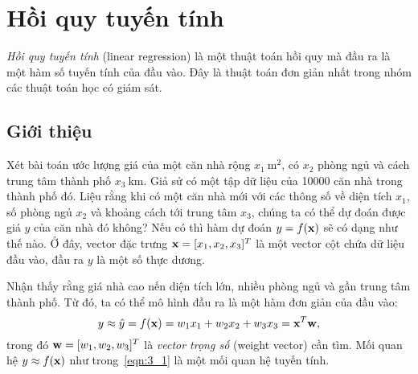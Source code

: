 \chapter{Hồi quy tuyến tính}
\label{cha:linear_regression}

\textit{Hồi quy tuyến tính} (linear regression) là một thuật toán hồi quy mà đầu ra là một hàm số tuyến tính của đầu vào. Đây là thuật toán đơn giản nhất trong nhóm các thuật toán học có giám sát.
\section{Giới thiệu}
Xét bài toán ước lượng giá của một căn nhà rộng $x_1 ~ \text{m}^2$, có $x_2$
phòng ngủ và cách trung tâm thành phố $x_3~ \text{km}$. Giả sử có một tập dữ liệu của 10000 căn nhà trong thành phố đó. Liệu rằng khi có một căn nhà
mới với các thông số về diện tích $x_1$, số phòng ngủ $x_2$ và khoảng cách tới
trung tâm $x_3$, chúng ta có thể dự đoán được giá $y$ của căn nhà đó không? Nếu
có thì hàm dự đoán $y = f(\mathbf{x})$ sẽ có dạng như thế nào. Ở đây, vector đặc
trưng $\mathbf{x} = [x_1, x_2, x_3]^T$ là một vector cột chứa dữ liệu đầu vào,
đầu ra $y$ là một số thực dương.

Nhận thấy rằng giá nhà cao nến diện tích lớn, nhiều phòng ngủ và gần trung tâm thành phố. Từ đó, ta có thể mô hình đầu ra là một hàm đơn giản của đầu vào:
\begin{equation}
\label{eqn:3_1}
y \approx \hat{y} = f(\mathbf{x}) = w_1 x_1 + w_2 x_2 + w_3 x_3 = \mathbf{x}^T\mathbf{w},
\end{equation}
trong đó $\mathbf{w} = [w_1, w_2, w_3]^T$ là \textit{vector trọng số} (weight vector) cần tìm. Mối quan hệ $y \approx f(\mathbf{x})$ như trong~\eqref{eqn:3_1} là một mối quan hệ tuyến tính.



